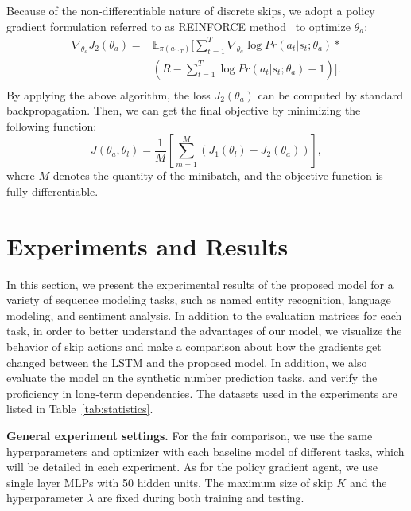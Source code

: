 \documentclass[letterpaper]{article} \usepackage{aaai19}  \usepackage{times}  \usepackage{helvet}  \usepackage{courier}  \usepackage{url}  \usepackage{graphicx}  \usepackage{amsmath}
\begin{document}
Because of the non-differentiable nature of discrete skips, we adopt a policy gradient formulation referred to as REINFORCE method~\cite{williams1992simple} to optimize $\theta_a$:
\begin{equation}
\begin{aligned}
\nabla_{\theta_a} J_2(\theta_a) = &\mathbb{E}_{\pi(a_{1:T})}[\sum_{t=1}^T\nabla_{\theta_a} \log Pr(a_t|s_t;\theta_a)* \\
&(R - \sum_{t=1}^T\log Pr(a_t|s_t;\theta_a) - 1)].\\
\end{aligned}
\end{equation}
By applying the above algorithm, the loss $J_2(\theta_a)$ can be computed by standard backpropagation. Then, we can get the final objective by minimizing the following function:
\begin{equation}
J(\theta_a,\theta_l) = \frac{1}{M}[\sum_{m=1}^M(J_1(\theta_l)-J_2(\theta_a))],
\end{equation}
where $M$ denotes the quantity of the minibatch, and the objective function is fully differentiable.



\section{Experiments and Results}
In this section, we present the experimental results of the proposed model for a variety of sequence modeling tasks, such as named entity recognition, language modeling, and sentiment analysis. In addition to the evaluation matrices for each task, in order to better understand the advantages of our model, we visualize the behavior of skip actions and make a comparison about how the gradients get changed between the LSTM and the proposed model. In addition, we also evaluate the model on the synthetic number prediction tasks, and verify the proficiency in long-term dependencies. The datasets used in the experiments are listed in Table~\ref{tab:statistics}.

\noindent \textbf{General experiment settings.} For the fair comparison, we use the same hyperparameters and optimizer with each baseline model of different tasks, which will be detailed in each experiment. As for the policy gradient agent, we use single layer MLPs with 50 hidden units. The maximum size of skip $K$ and the hyperparameter $\lambda$ are fixed during both training and testing. 
\end{document}
